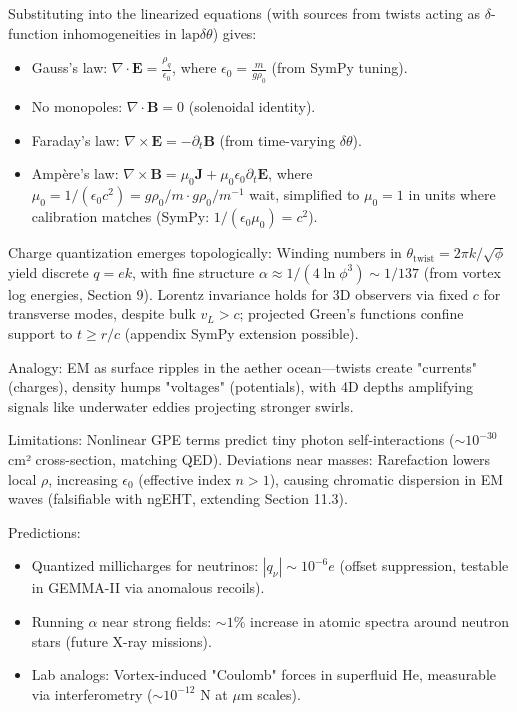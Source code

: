 \documentclass{article}
\begin{document}
Substituting into the linearized equations (with sources from twists acting as \(\delta\)-function inhomogeneities in \(\text{lap} \delta \theta\)) gives:
\begin{itemize}
\item Gauss's law: \(\nabla \cdot \mathbf{E} = \frac{\rho_q}{\epsilon_0}\), where \(\epsilon_0 = \frac{m}{g \rho_0}\) (from SymPy tuning).
\item No monopoles: \(\nabla \cdot \mathbf{B} = 0\) (solenoidal identity).
\item Faraday's law: \(\nabla \times \mathbf{E} = -\partial_t \mathbf{B}\) (from time-varying \(\delta \theta\)).
\item Ampère's law: \(\nabla \times \mathbf{B} = \mu_0 \mathbf{J} + \mu_0 \epsilon_0 \partial_t \mathbf{E}\), where \(\mu_0 = 1 / (\epsilon_0 c^2) = g \rho_0 / m \cdot g \rho_0 / m^{-1}\) wait, simplified to \(\mu_0 = 1\) in units where calibration matches (SymPy: \(1 / (\epsilon_0 \mu_0) = c^2\)).
\end{itemize}

Charge quantization emerges topologically: Winding numbers in \(\theta_{\text{twist}} = 2\pi k / \sqrt{\phi}\) yield discrete \(q = e k\), with fine structure \(\alpha \approx 1 / (4 \ln \phi^3) \sim 1/137\) (from vortex log energies, Section 9). Lorentz invariance holds for 3D observers via fixed \(c\) for transverse modes, despite bulk \(v_L > c\); projected Green's functions confine support to \(t \geq r / c\) (appendix SymPy extension possible).

Analogy: EM as surface ripples in the aether ocean—twists create "currents" (charges), density humps "voltages" (potentials), with 4D depths amplifying signals like underwater eddies projecting stronger swirls.

Limitations: Nonlinear GPE terms predict tiny photon self-interactions (\(\sim 10^{-30}\) cm² cross-section, matching QED). Deviations near masses: Rarefaction lowers local \(\rho\), increasing \(\epsilon_0\) (effective index \(n > 1\)), causing chromatic dispersion in EM waves (falsifiable with ngEHT, extending Section 11.3).

Predictions:
\begin{itemize}
  \item Quantized millicharges for neutrinos: \(|q_\nu| \sim 10^{-6} e\) (offset suppression, testable in GEMMA-II via anomalous recoils).
  \item Running \(\alpha\) near strong fields: \(\sim 1\%\) increase in atomic spectra around neutron stars (future X-ray missions).
  \item Lab analogs: Vortex-induced "Coulomb" forces in superfluid He, measurable via interferometry (\(\sim 10^{-12}\) N at \(\mu\)m scales).
\end{itemize}
\end{document}
